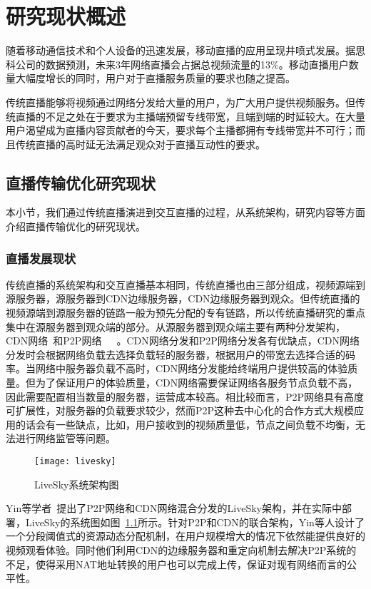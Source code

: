 \chapter{研究现状概述}
随着移动通信技术和个人设备的迅速发展，移动直播的应用呈现井喷式发展。据思科公司的数据预测，未来3年网络直播会占据总视频流量的13\%。移动直播用户数量大幅度增长的同时，用户对于直播服务质量的要求也随之提高。

传统直播能够将视频通过网络分发给大量的用户，为广大用户提供视频服务。但传统直播的不足之处在于要求为主播端预留专线带宽，且端到端的时延较大。在大量用户渴望成为直播内容贡献者的今天，要求每个主播都拥有专线带宽并不可行；而且传统直播的高时延无法满足观众对于直播互动性的要求。


\section{直播传输优化研究现状}
本小节，我们通过传统直播演进到交互直播的过程，从系统架构，研究内容等方面介绍直播传输优化的研究现状。
\subsection{直播发展现状}
传统直播的系统架构和交互直播基本相同，传统直播也由三部分组成，视频源端到源服务器，源服务器到CDN边缘服务器，CDN边缘服务器到观众。但传统直播的视频源端到源服务器的链路一般为预先分配的专有链路，所以传统直播研究的重点集中在源服务器到观众端的部分。从源服务器到观众端主要有两种分发架构，CDN网络~\cite{mukerjee2015practical}和P2P网络~\cite{liao2006anysee}~\cite{hei2007inferring}~\cite{magharei2007mesh}。CDN网络分发和P2P网络分发各有优缺点，CDN网络分发时会根据网络负载去选择负载轻的服务器，根据用户的带宽去选择合适的码率。当网络中服务器负载不高时，CDN网络分发能给终端用户提供较高的体验质量。但为了保证用户的体验质量，CDN网络需要保证网络各服务节点负载不高，因此需要配置相当数量的服务器，运营成本较高。相比较而言，P2P网络具有高度可扩展性，对服务器的负载要求较少，然而P2P这种去中心化的合作方式大规模应用的话会有一些缺点，比如，用户接收到的视频质量低，节点之间负载不均衡，无法进行网络监管等问题。

\begin{figure}[h]%
  \centering
  \texttt{[image: livesky]}
  \caption{LiveSky系统架构图~\cite{yin2009design}}
  \label{fig:livesky}
\end{figure}

Yin等学者~\cite{yin2009design}提出了P2P网络和CDN网络混合分发的LiveSky架构，并在实际中部署，LiveSky的系统图如图~\ref{fig:livesky}所示。针对P2P和CDN的联合架构，Yin等人设计了一个分段阈值式的资源动态分配机制，在用户规模增大的情况下依然能提供良好的视频观看体验。同时他们利用CDN的边缘服务器和重定向机制去解决P2P系统的不足，使得采用NAT地址转换的用户也可以完成上传，保证对现有网络而言的公平性。

